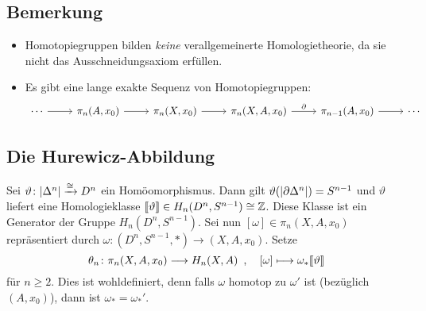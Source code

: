\subsection[Bemerkung: Homotopiegruppen bilden keine verallgemeinerte Homologietheorie]{Bemerkung} %
\label{sub:1520}
\begin{itemize}
	\item Homotopiegruppen bilden \emph{keine} verallgemeinerte Homologietheorie, da sie nicht das Ausschneidungsaxiom erfüllen.
	\item Es gibt eine lange exakte Sequenz von Homotopiegruppen:
	\[
		\begin{tikzcd}
			\cdots \rar & \pi_n(A,x_0) \rar & \pi_n(X,x_0) \rar & \pi_n(X,A,x_0) \rar["\partial"] & \pi_{n-1}(A,x_0) \rar & \cdots
		\end{tikzcd}
	\]
\end{itemize}

\subsection{Die Hurewicz-Abbildung} %
\label{sub:1521}
Sei $\vartheta \colon \abs*{\Delta^n} \xrightarrow{\cong} D^n$ ein Homöomorphismus. Dann gilt $\vartheta \enbrace*{\abs*{\partial \Delta^n}}= S^{n-1}$ und $\vartheta$ liefert eine 
Homologieklasse $\llbracket\vartheta\rrbracket \in H_n(D^n,S^{n-1}) \cong \mathbb{Z}$. Diese Klasse ist ein Generator der Gruppe $H_n(D^n,S^{n-1})$. Sei nun $[\omega] \in \pi_n(X,A,x_0)$
repräsentiert durch $\omega \colon (D^n,S^{n-1},*) \to (X,A,x_0)$. Setze 
\[
	\theta_n \colon \pi_n(X,A,x_0) \longrightarrow H_n(X,A) \enspace, \quad [\omega] \longmapsto \omega_*\llbracket\vartheta\rrbracket 
\]
für $n \ge 2$. Dies ist wohldefiniert, denn falls $\omega$ homotop zu $\omega'$ ist (bezüglich $(A,x_0)$), dann ist $\omega_*=\omega_*'$.

